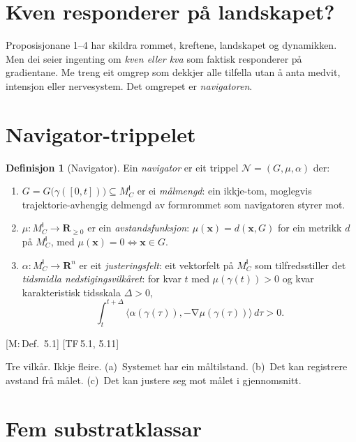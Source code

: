 \documentclass[10pt]{book}
\theoremstyle{definition}
\newtheorem{definisjon}{Definisjon}[chapter]
\theoremstyle{plain}
\theoremstyle{remark}
\newcommand{\MC}{M^{\mathsf{I}}_C}
\providecommand{\Rn}{}
\renewcommand{\Rn}{\mathbf{R}^n}
\providecommand{\R}{}
\renewcommand{\R}{\mathbf{R}}
\newcommand{\Nav}{\mathcal{N}}
\newcommand{\inner}[2]{\langle #1, #2 \rangle}
\DeclareMathOperator{\grad}{\nabla}
\newcommand{\TF}[1]{\textnormal{[TF\,#1]}}
\newcommand{\Mref}[1]{\textnormal{[M:\,#1]}}
\begin{document}
\section{Kven responderer p\aa{} landskapet?}\label{sec:nav:intuisjon}

Proposisjonane 1--4 har skildra rommet, kreftene, landskapet og dynamikken. Men dei seier ingenting om \emph{kven eller kva} som faktisk responderer p\aa{} gradientane. Me treng eit omgrep som dekkjer alle tilfella utan \aa{} anta medvit, intensjon eller nervesystem. Det omgrepet er \emph{navigatoren}.

\section{Navigator-trippelet}\label{sec:nav:def}

\begin{definisjon}[Navigator]\label{def:navigator}
Ein \emph{navigator} er eit trippel $\Nav = (G, \mu, \alpha)$ der:
\begin{enumerate}[label=(\alph*)]
  \item $G = G\bigl(\gamma([0,t])\bigr) \subseteq \MC$ er ei \emph{m\aa lmengd}: ein ikkje-tom, moglegvis trajektorie-avhengig delmengd av formrommet som navigatoren styrer mot.
  \item $\mu : \MC \to \R_{\geq 0}$ er ein \emph{avstandsfunksjon}: $\mu(\bm{x}) = d(\bm{x}, G)$ for ein metrikk $d$ p\aa{} $\MC$, med $\mu(\bm{x}) = 0 \iff \bm{x} \in G$.
  \item $\alpha : \MC \to \Rn$ er eit \emph{justeringsfelt}: eit vektorfelt p\aa{} $\MC$ som tilfredsstiller det \emph{tidsmidla nedstigingsvilk\aa ret}: for kvar $t$ med $\mu(\gamma(t)) > 0$ og kvar karakteristisk tidsskala $\Delta > 0$,
  \begin{equation}\label{eq:justering}
    \int_t^{t+\Delta} \inner{\alpha(\gamma(\tau))}{-\grad\mu(\gamma(\tau))} \, d\tau > 0.
  \end{equation}
\end{enumerate}
\Mref{Def.~5.1} \TF{5.1, 5.11}
\end{definisjon}

Tre vilk\aa r. Ikkje fleire. (a)~Systemet har ein m\aa ltilstand. (b)~Det kan registrere avstand fr\aa{} m\aa let. (c)~Det kan justere seg mot m\aa let i gjennomsnitt.

\section{Fem substratklassar}\label{sec:nav:substrat}
\end{document}
